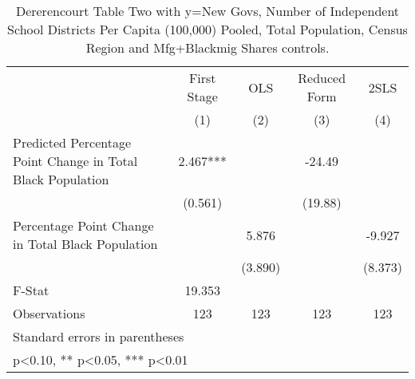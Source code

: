 \begin{table}[htbp]\centering
\def\sym#1{\ifmmode^{#1}\else\(^{#1}\)\fi}
\caption{Dererencourt Table Two with y=New Govs, Number of Independent School Districts Per Capita (100,000) Pooled, Total Population, Census Region and Mfg+Blackmig Shares controls.}
\begin{tabular}{l*{4}{c}}
\toprule
                    & First Stage   &         OLS   &Reduced Form   &        2SLS   \\
                    &\multicolumn{1}{c}{(1)}   &\multicolumn{1}{c}{(2)}   &\multicolumn{1}{c}{(3)}   &\multicolumn{1}{c}{(4)}   \\
\midrule
Predicted Percentage Point Change in Total Black Population&       2.467***&               &      -24.49   &               \\
                    &     (0.561)   &               &     (19.88)   &               \\
\addlinespace
Percentage Point Change in Total Black Population&               &       5.876   &               &      -9.927   \\
                    &               &     (3.890)   &               &     (8.373)   \\
\midrule
F-Stat              &      19.353   &               &               &               \\
Observations        &         123   &         123   &         123   &         123   \\
\bottomrule
\multicolumn{5}{l}{\footnotesize Standard errors in parentheses}\\
\multicolumn{5}{l}{\footnotesize * p<0.10, ** p<0.05, *** p<0.01}\\
\end{tabular}
\end{table}
